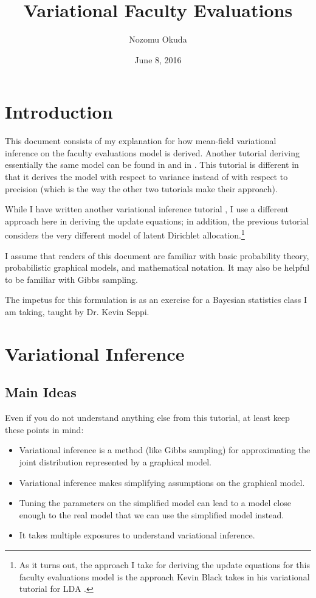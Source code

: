 \documentclass[12pt]{article}
\title{Variational Faculty Evaluations}
\author{Nozomu Okuda}
\date{June 8, 2016}
\begin{document}
\maketitle

\section{Introduction}

This document consists of my explanation for how mean-field variational
inference on the faculty evaluations model is derived.  Another tutorial
deriving essentially the same model can be found in \autocite{foxvartut} and in
\autocite{wikivar}.  This tutorial is different in that it derives the model
with respect to variance instead of with respect to precision (which is the way
the other two tutorials make their approach).

While I have written another variational inference tutorial \autocite{myvarlda},
I use a different approach here in deriving the update equations; in addition,
the previous tutorial considers the very different model of latent Dirichlet
allocation.\footnote{As it turns out, the approach I take for deriving the
update equations for this faculty evaluations model is the approach Kevin Black
takes in his variational tutorial for LDA \autocite{kb}.}

I assume that readers of this document are familiar with basic probability
theory, probabilistic graphical models, and mathematical notation.  It may also
be helpful to be familiar with Gibbs sampling.

The impetus for this formulation is as an exercise for a Bayesian statistics
class I am taking, taught by Dr. Kevin Seppi.

\section{Variational Inference}

\subsection{Main Ideas}

Even if you do not understand anything else from this tutorial, at least keep
these points in mind:

\begin{itemize}
    \item Variational inference is a method (like Gibbs sampling) for
        approximating the joint distribution represented by a graphical model.
    \item Variational inference makes simplifying assumptions on the graphical
        model.
    \item Tuning the parameters on the simplified model can lead to a model
        close enough to the real model that we can use the simplified model
        instead.
    \item It takes multiple exposures to understand variational inference.
\end{itemize}
\end{document}

